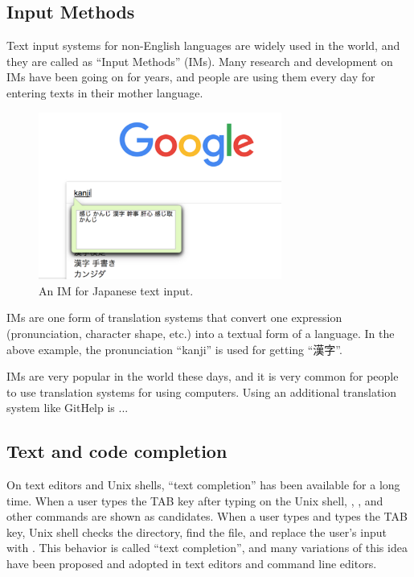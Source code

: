 \documentclass{sigchi}
\def\GH{\textsf{GitHelp}}
\begin{document}
\subsection{Input Methods}

Text input systems for non-English languages are widely used
in the world,
and they are called as ``Input Methods'' (IMs).
%
Many research and development on IMs have been going on for years, and
people are using them every day for entering texts in their mother language.

\begin{figure}[h]
  \includegraphics[width=8cm,bb=0 0 976 670]{figures/nyuuryoku-ime.png}
  \caption{An IM for Japanese text input.}
  \label{bash1}
\end{figure}

IMs are one form of translation systems that convert one
expression (pronunciation, character shape, etc.)
into a textual form of a language.
In the above example, the pronunciation ``kanji''
is used for getting ``漢字''.

IMs are very popular in the world these days,
and it is very common for people to 
use translation systems for using computers.
Using an additional translation system like {\GH} is ...

\subsection{Text and code completion}

On text editors and Unix shells,
``text completion'' has been available for a long time.
%
When a user types the TAB key after typing  on the Unix shell,
, , and other commands are shown as candidates.
When a user types  and types the TAB key,
Unix shell checks the directory, find the  file, and
replace the user's input with .
This behavior is called ``text completion'', and many variations of
this idea have been proposed and adopted in text editors and command line editors.
\end{document}
